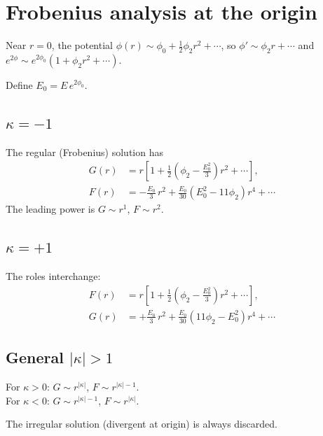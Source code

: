 \documentclass[11pt,letterpaper]{article}
\numberwithin{equation}{section}
\begin{document}
\section{Frobenius analysis at the origin}
\label{sec:frobenius}

Near $r = 0$, the potential $\phi(r) \sim \phi_0 + \tfrac{1}{2}\phi_2 r^2 + \cdots$,
so $\phi' \sim \phi_2 r + \cdots$ and $e^{2\phi} \sim e^{2\phi_0}(1 + \phi_2 r^2 + \cdots)$.

Define $E_0 = E\,e^{2\phi_0}$.

\subsection{$\kappa = -1$}

The regular (Frobenius) solution has
\begin{align}
  G(r) &= r\!\left[1 + \tfrac{1}{2}\!\left(\phi_2 - \tfrac{E_0^2}{3}\right)r^2 + \cdots\right], \label{eq:frob_km1_G}\\
  F(r) &= -\frac{E_0}{3}\,r^2 + \frac{E_0}{30}\!\left(E_0^2 - 11\phi_2\right)r^4 + \cdots \label{eq:frob_km1_F}
\end{align}
The leading power is $G \sim r^1$, $F \sim r^2$.

\subsection{$\kappa = +1$}

The roles interchange:
\begin{align}
  F(r) &= r\!\left[1 + \tfrac{1}{2}\!\left(\phi_2 - \tfrac{E_0^2}{3}\right)r^2 + \cdots\right], \label{eq:frob_kp1_F}\\
  G(r) &= +\frac{E_0}{3}\,r^2 + \frac{E_0}{30}\!\left(11\phi_2 - E_0^2\right)r^4 + \cdots \label{eq:frob_kp1_G}
\end{align}

\subsection{General $|\kappa| > 1$}

For $\kappa > 0$: $G \sim r^{|\kappa|}$, $F \sim r^{|\kappa|-1}$.\\
For $\kappa < 0$: $G \sim r^{|\kappa|-1}$, $F \sim r^{|\kappa|}$.

The irregular solution (divergent at origin) is always discarded.
\end{document}
